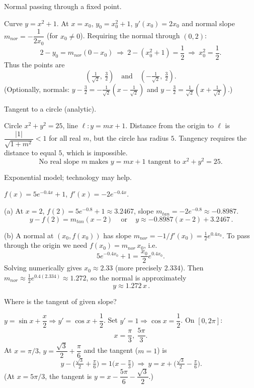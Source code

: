 \documentclass[11pt]{article}
\def\textbf#1{#1}%
\def\mathrm#1{#1}%
\begin{document}
\begin{solution}
\textbf{Normal passing through a fixed point.}

Curve $y=x^2+1$. At $x=x_0$, $y_0=x_0^2+1$, $y'(x_0)=2x_0$ and normal slope $m_{\mathrm{nor}}=-\dfrac{1}{2x_0}$ (for $x_0\neq 0$).  
Requiring the normal through $(0,2)$:
\[
2-y_0=m_{\mathrm{nor}}(0-x_0)\ \Rightarrow\ 2-(x_0^2+1)=\frac{1}{2}\ \Rightarrow\ x_0^2=\frac12.
\]
Thus the points are
\[
\boxed{\left(\tfrac{1}{\sqrt{2}},\ \tfrac{3}{2}\right)}\quad\text{and}\quad
\boxed{\left(-\tfrac{1}{\sqrt{2}},\ \tfrac{3}{2}\right)}.
\]
(Optionally, normals: $y-\tfrac{3}{2}=-\tfrac{1}{\sqrt{2}}\!\left(x-\tfrac{1}{\sqrt{2}}\right)$ and $y-\tfrac{3}{2}=\tfrac{1}{\sqrt{2}}\!\left(x+\tfrac{1}{\sqrt{2}}\right)$.)
\end{solution}

\begin{solution}
\textbf{Tangent to a circle (analytic).}

Circle $x^2+y^2=25$, line $\ell:y=mx+1$.  
Distance from the origin to $\ell$ is $\dfrac{|1|}{\sqrt{1+m^2}}<1$ for all real $m$, but the circle has radius $5$.  
Tangency requires the distance to equal $5$, which is impossible.  
\[
\boxed{\text{No real slope } m\ \text{makes } y=mx+1 \text{ tangent to } x^2+y^2=25.}
\]
\end{solution}

\begin{solution}
\textbf{Exponential model; technology may help.}

$f(x)=5e^{-0.4x}+1$, $f'(x)=-2e^{-0.4x}$.

(a) At $x=2$, $f(2)=5e^{-0.8}+1\approx 3.2467$, slope $m_{\mathrm{tan}}=-2e^{-0.8}\approx -0.8987$.
\[
\boxed{\,y-f(2)=m_{\mathrm{tan}}(x-2)\,}\quad\text{or}\quad
\boxed{\,y\approx -0.8987(x-2)+3.2467\,}.
\]

(b) A normal at $(x_0,f(x_0))$ has slope $m_{\mathrm{nor}}=-1/f'(x_0)=\tfrac{1}{2}e^{0.4x_0}$.
To pass through the origin we need $f(x_0)=m_{\mathrm{nor}}\,x_0$, i.e.
\[
5e^{-0.4x_0}+1=\frac{x_0}{2}e^{0.4x_0}.
\]
Solving numerically gives $\boxed{x_0\approx 2.33}$ (more precisely $2.334$).  
Then $m_{\mathrm{nor}}\approx \tfrac12 e^{0.4(2.334)}\approx 1.272$, so the normal is approximately
\[
\boxed{\,y\approx 1.272\,x\,}.
\]
\end{solution}

\begin{solution}
\textbf{Where is the tangent of given slope?}

$y=\sin x+\dfrac{x}{2}\Rightarrow y'=\cos x+\dfrac12$.  
Set $y'=1\Rightarrow \cos x=\dfrac12$. On $[0,2\pi]$:
\[
\boxed{x=\frac{\pi}{3},\ \frac{5\pi}{3}}.
\]
At $x=\pi/3$, $y=\dfrac{\sqrt{3}}{2}+\dfrac{\pi}{6}$ and the tangent ($m=1$) is
\[
\boxed{\,y-\Big(\tfrac{\sqrt{3}}{2}+\tfrac{\pi}{6}\Big)=1\Big(x-\tfrac{\pi}{3}\Big)\ \Rightarrow\
y=x+\Big(\tfrac{\sqrt{3}}{2}-\tfrac{\pi}{6}\Big).}
\]
(At $x=5\pi/3$, the tangent is $y=x-\dfrac{5\pi}{6}-\dfrac{\sqrt{3}}{2}$.)
\end{solution}
\end{document}
